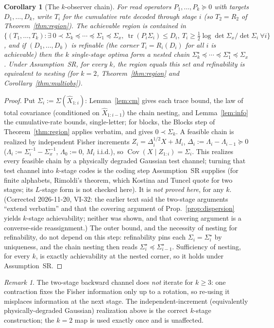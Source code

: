 \documentclass[11pt]{article}
\newtheorem{corollary}{Corollary}
\theoremstyle{definition}
\theoremstyle{remark}
\newtheorem*{remark}{Remark}
\newcommand{\tr}{\operatorname{tr}}
\newcommand{\Cov}{\operatorname{Cov}}
\begin{document}
\begin{corollary}[The $k$-observer chain]\label{cor:kobs}
For read operators $P_1,\dots,P_k\succeq0$ with targets $D_1,\dots,D_k$, write $T_i$ for
the \emph{cumulative} rate decoded through stage $i$ (so $T_2=R_2$ of
Theorem~\ref{thm:region}). The achievable region is contained in
$\{(T_1,\dots,T_k):\exists\ 0\prec\Sigma_k\preceq\cdots\preceq\Sigma_1\preceq\Sigma_x,\
\tr(P_i\Sigma_i)\le D_i,\ T_i\ge\tfrac12\log\det\Sigma_x/\det\Sigma_i\ \forall i\}$, and if
$(D_1,\dots,D_k)$ is refinable (the corner $T_i=R_i(D_i)$ for all $i$ is achievable)
then the $k$ single-stage optima form a nested chain
$\Sigma_k^\star\preceq\cdots\preceq\Sigma_1^\star\preceq\Sigma_x$. Under Assumption~SR,
for every $k$, the region equals this set and refinability is equivalent to nesting (for
$k=2$, Theorem~\ref{thm:region} and Corollary~\ref{thm:multiobs}).
\end{corollary}
\begin{proof}
Put $\Sigma_i:=\Sigma(\hat X_{1:i})$: Lemma~\ref{lem:cm} gives each trace bound, the law
of total covariance (conditioned on $\hat X_{1:i-1}$) the chain nesting, and
Lemma~\ref{lem:info} the cumulative-rate bounds, single-letter; for blocks, the Blocks step
of Theorem~\ref{thm:region} applies verbatim, and gives $0\prec\Sigma_k$. A feasible chain is realized by
independent Fisher increments $Z_i=\Delta_i^{1/2}X+M_i$, $\Delta_i:=\Lambda_i-
\Lambda_{i-1}\succeq0$ ($\Lambda_i:=\Sigma_i^{-1}-\Sigma_x^{-1}$, $\Lambda_0:=0$, $M_i$
i.i.d.), so $\Cov(X\mid Z_{1:i})=\Sigma_i$. This realizes every feasible chain by a
physically degraded Gaussian test channel; turning that test channel into $k$-stage codes
is the coding step Assumption~SR supplies (for finite alphabets, Rimoldi's theorem, which
Kostina and Tuncel quote for two stages; its $L$-stage form is not checked here). It is \emph{not proved here}, for any $k$.
(Corrected 2026-11-20, VI-32: the earlier text said the two-stage arguments ``extend
verbatim'' and that the covering argument of Prop.~\ref{prop:dispersion} yields $k$-stage
achievability; neither was shown, and that covering argument is a converse-side
reassignment.) The outer bound, and the necessity of nesting for refinability, do not
depend on this step: refinability pins each $\Sigma_i=\Sigma_i^\star$ by uniqueness, and
the chain nesting then reads $\Sigma_i^\star\preceq\Sigma_{i-1}^\star$. Sufficiency of
nesting, for every $k$, is exactly achievability at the nested corner, so it holds under
Assumption~SR.
\end{proof}
\begin{remark}
The two-stage backward channel does \emph{not} iterate for $k\ge3$: one contraction fixes
the Fisher information only up to a rotation, so re-using it misplaces information at the
next stage. The independent-increment (equivalently physically-degraded Gaussian)
realization above is the correct $k$-stage construction; the $k=2$ map is used exactly
once and is unaffected.
\end{remark}
\end{document}
